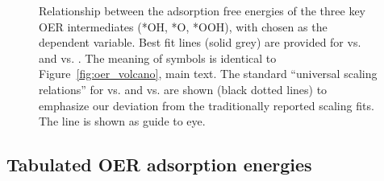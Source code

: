 %
%






\begin{figure}[!htb]
\centering
{}
\caption{\label{fig:scaling_relations}
%
Relationship between the adsorption free energies of the three key OER intermediates (*OH, *O, *OOH), with \DGOH chosen as the dependent variable.
%
Best fit lines (solid grey) are provided for \DGOOH vs. \DGOH and \DGO vs. \DGOH.
%
The meaning of symbols is identical to Figure~\ref{fig:oer_volcano}, main text.
%
The standard ``universal scaling relations'' for \DGOOH vs. \DGOH and \DGO vs. \DGOH are shown (black dotted lines) to emphasize our deviation from the traditionally reported scaling fits.
%
The \DGOH line is shown as guide to eye.
}
\end{figure}


\subsection{Tabulated OER adsorption energies}
%


